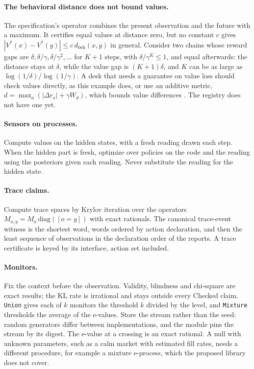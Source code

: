 \documentclass[11pt]{article}
\newcommand{\code}[1]{\texttt{#1}}
\newcommand{\dbeh}{d_{\mathrm{beh}}}
\theoremstyle{definition}
\theoremstyle{plain}
\begin{document}
\paragraph{The behavioral distance does not bound values.} The specification's operator combines the
present observation and the future with a maximum. It certifies equal values at distance zero, but no
constant $c$ gives $|V^*(x)-V^*(y)|\le c\,\dbeh(x,y)$ in general. Consider two chains whose reward gaps
are $\delta,\delta/\gamma,\delta/\gamma^2,\dots$ for $K+1$ steps, with $\delta/\gamma^K\le1$, and equal
afterwards: the distance stays at $\delta$, while the value gap is $(K+1)\delta$, and $K$ can be as large
as $\log(1/\delta)/\log(1/\gamma)$. A desk that needs a guarantee on value loss should check values
directly, as this example does, or use an additive metric, $d=\max_a(|\Delta r_a|+\gamma W_d)$, which
bounds value differences \cite{ferns}. The registry does not have one yet.

\paragraph{Sensors on processes.} Compute values on the hidden states, with a fresh reading drawn each
step. When the hidden part is fresh, optimize over policies on the code and the reading using the
posteriors given each reading. Never substitute the reading for the hidden state.

\paragraph{Trace claims.} Compute trace spaces by Krylov iteration over the operators
$M_{a,y}=M_a\,\mathrm{diag}([o=y])$ with exact rationals. The canonical trace-event witness is the
shortest word, words ordered by action declaration, and then the least sequence of observations in the
declaration order of the reports. A trace certificate is keyed by its interface, action set included.

\paragraph{Monitors.} Fix the context before the observation. Validity, blindness and chi-square are exact
results; the KL rate is irrational and stays outside every Checked claim. \code{Union} gives each of $k$
monitors the threshold $k$ divided by the level, and \code{Mixture} thresholds the average of the
e-values. Store the stream rather than the seed: random generators differ between implementations, and
the module pins the stream by its digest. The e-value at a crossing is an exact rational. A null with
unknown parameters, such as a calm market with estimated fill rates, needs a different procedure, for
example a mixture e-process, which the proposed library does not cover.
\end{document}
